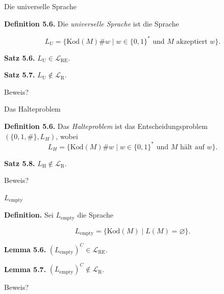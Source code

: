 \documentclass[11pt,aspectratio=169]{beamer}
\begin{document}
\begin{frame}{Die universelle Sprache}

    \justifying

    \textbf{Definition 5.6.}
    Die \textit{universelle Sprache} ist die Sprache

    \[
        L_U = \{\text{Kod}(M)\#w \mid w \in \{0, 1\}^* \text{ und } M \text{ akzeptiert } w\}.
    \]

    \vspace{1em}

    \textbf{Satz 5.6.} \(L_{\text{U}} \in \mathcal L_{\text{RE}}\).

    \vspace{1em}

    \textbf{Satz 5.7.} \(L_{\text{U}} \not\in \mathcal L_{\text{R}}\).

    \vspace{1em}

    Beweis?
\end{frame}

\begin{frame}{Das Halteproblem}

    \justifying

    \textbf{Definition 5.6.}
    Das \textit{Halteproblem} ist das Entscheidungsproblem \((\{0, 1, \#\}, L_H)\), wobei
    \[
        L_H = \{\text{Kod}(M)\#w \mid w \in \{0, 1\}^* \text{ und } M \text{ hält auf } w\}.
    \]

    \vspace{1em}

    \textbf{Satz 5.8.} \(L_{\text{H}} \not\in \mathcal L_{\text{R}}\).

    \vspace{1em}

    Beweis?
\end{frame}

\begin{frame}{\(L_{\text{empty}}\)}

    \justifying

    \textbf{Definition.} Sei \(L_{\text{empty}}\) die Sprache
    
    \[
        L_{\text{empty}} = \{\text{Kod}(M) \mid L(M) = \varnothing\}.
    \]

    \vspace{1em}

    \textbf{Lemma 5.6.} \((L_{\text{empty}})^C \in \mathcal L_{\text{RE}}\).

    \vspace{1em}

    \textbf{Lemma 5.7.} \((L_{\text{empty}})^C \not\in \mathcal L_{\text{R}}\).

    \vspace{1em}

    Beweis?
\end{frame}
\end{document}
